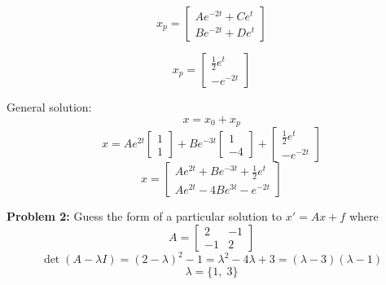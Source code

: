 \documentclass[12pt]{article}
\begin{document}
\[x_p = \begin{bmatrix}
    Ae^{-2t} + Ce^t\\
    Be^{-2t} + De^t
\end{bmatrix}\]

\[x_p = \begin{bmatrix}
    \frac{1}{2}e^t\\
    -e^{-2t}
\end{bmatrix}\]

General solution:
\[x = x_0 + x_p\]
\[x = Ae^{2t} \begin{bmatrix}
    1\\1
\end{bmatrix} + Be^{-3t} \begin{bmatrix}
    1\\-4
\end{bmatrix} + \begin{bmatrix}
    \frac{1}{2}e^t\\
    -e^{-2t}
\end{bmatrix}\]
\[\boxed{x = \begin{bmatrix}
    Ae^{2t} + Be^{-3t} + \frac{1}{2}e^t\\
    Ae^{2t} - 4Be^{3t} - e^{-2t}
\end{bmatrix}}\]

\pagebreak

\textbf{Problem 2:} Guess the form of a particular
solution to $x' = Ax + f$ where
\[A = \begin{bmatrix}
    2 & -1\\
    -1 & 2
\end{bmatrix}\]
\[\det (A - \lambda I) = (2 - \lambda)^2 - 1 = \lambda^2 - 4\lambda + 3 = (\lambda - 3)(\lambda - 1)\]
\[\lambda = \{1, \; 3\}\]
\end{document}
